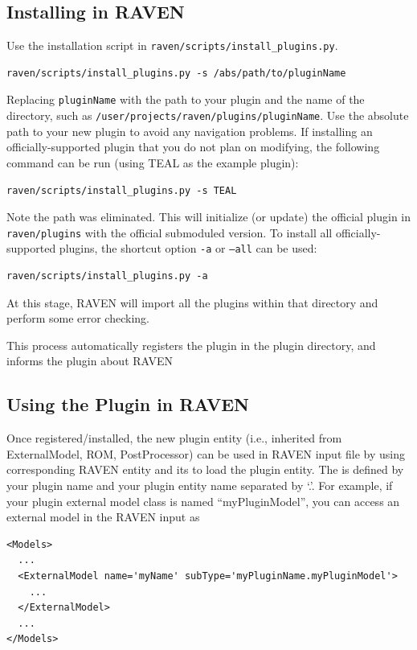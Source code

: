 \subsection{Installing in RAVEN}
Use the installation script in \texttt{raven/scripts/install\_plugins.py}.
\begin{lstlisting}[morekeywords={examplePlugin, pluginInstallation}]
  raven/scripts/install_plugins.py -s /abs/path/to/pluginName
\end{lstlisting}
Replacing \texttt{pluginName} with the path to your plugin and the name of the directory, such as
\texttt{/user/projects/raven/plugins/pluginName}.
Use the absolute path to your new plugin to avoid any navigation problems.
If installing an officially-supported plugin that you do not plan on modifying, the following command
can be run (using TEAL as the example plugin):
\begin{lstlisting}[morekeywords={examplePlugin, TEALInstallation}]
  raven/scripts/install_plugins.py -s TEAL
\end{lstlisting}
Note the path was eliminated. This will initialize (or update) the official plugin in
\texttt{raven/plugins} with the official submoduled version.
To install all officially-supported plugins, the shortcut option \texttt{-a} or \texttt{--all} can be used:
\begin{lstlisting}[morekeywords={examplePlugin, installAllPlugin}]
  raven/scripts/install_plugins.py -a
\end{lstlisting}
At this stage, RAVEN will import all the plugins within that directory and perform some error checking.

This process automatically registers the plugin in the plugin directory, and informs the plugin
about RAVEN %

\subsection{Using the Plugin in RAVEN}
Once registered/installed, the new plugin entity (i.e., inherited from ExternalModel, ROM, PostProcessor) can be used in RAVEN input file by
using corresponding RAVEN entity and its  to load the plugin entity. The  is defined by your plugin name and your
plugin entity name separated by `.'.
For example, if your plugin external model class is named ``myPluginModel'',
you can access an external model in the RAVEN input as

\begin{lstlisting}[style=XML, morekeywords={usingPlugin}]
<Models>
  ...
  <ExternalModel name='myName' subType='myPluginName.myPluginModel'>
    ...
  </ExternalModel>
  ...
</Models>
\end{lstlisting}

